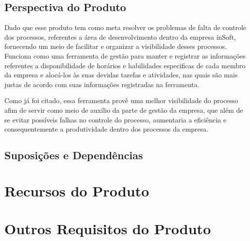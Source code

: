     \subsection{Perspectiva do Produto}

      Dado que esse produto tem como meta resolver os problemas de falta de controle dos processos, referentes a área de desenvolvimento dentro da empresa inSoft, fornecendo um meio de facilitar e organizar a visibilidade desses processos. Funciona como uma ferramenta de gestão para manter e registrar as informações referentes a disponibilidade de horários e habilidades especificas de cada membro da empresa e alocá-los às suas devidas tarefas e atividades, nas quais são mais justas de acordo com suas informações registradas na ferramenta.

      Como já foi citado, essa ferramenta provê uma melhor visibilidade do processo afim de servir como meio de auxílio da parte de gestão da empresa, que além de se evitar possíveis falhas no controle do processo, aumentaria a eficiência e consequentemente a produtividade dentro dos processos da empresa.

    \subsection{Suposições e Dependências}
  \section{Recursos do Produto}
  \section{Outros Requisitos do Produto}
